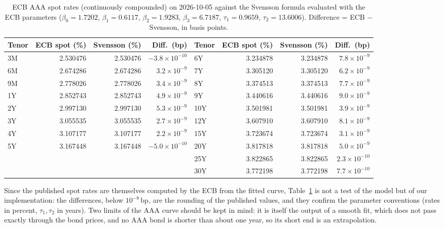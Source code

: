 \documentclass[11pt,a4paper]{article}
\theoremstyle{plain}
\theoremstyle{definition}
\newcommand{\bp}{\,\mathrm{bp}}
\begin{document}
\begin{table}[htbp]
\centering
\footnotesize
\setlength{\tabcolsep}{4pt}
\begin{tabular}{@{}lrrr@{\hspace{1.5em}}lrrr@{}}
\toprule
Tenor & ECB spot (\%) & Svensson (\%) & Diff.\ (bp) & Tenor & ECB spot (\%) & Svensson (\%) & Diff.\ (bp) \\
\midrule
3M  & 2.530476 & 2.530476 & $-3.8\times10^{-10}$ & 6Y  & 3.234878 & 3.234878 & $7.8\times10^{-9}$ \\
6M  & 2.674286 & 2.674286 & $3.2\times10^{-9}$   & 7Y  & 3.305120 & 3.305120 & $6.2\times10^{-9}$ \\
9M  & 2.778026 & 2.778026 & $3.4\times10^{-9}$   & 8Y  & 3.374513 & 3.374513 & $7.7\times10^{-9}$ \\
1Y  & 2.852743 & 2.852743 & $4.9\times10^{-9}$   & 9Y  & 3.440616 & 3.440616 & $9.0\times10^{-9}$ \\
2Y  & 2.997130 & 2.997130 & $5.3\times10^{-9}$   & 10Y & 3.501981 & 3.501981 & $3.9\times10^{-9}$ \\
3Y  & 3.055535 & 3.055535 & $2.7\times10^{-9}$   & 12Y & 3.607910 & 3.607910 & $8.1\times10^{-9}$ \\
4Y  & 3.107177 & 3.107177 & $2.2\times10^{-9}$   & 15Y & 3.723674 & 3.723674 & $3.1\times10^{-9}$ \\
5Y  & 3.167448 & 3.167448 & $-5.0\times10^{-10}$ & 20Y & 3.817818 & 3.817818 & $5.0\times10^{-9}$ \\
    &          &          &                      & 25Y & 3.822865 & 3.822865 & $2.3\times10^{-10}$ \\
    &          &          &                      & 30Y & 3.772198 & 3.772198 & $7.7\times10^{-10}$ \\
\bottomrule
\end{tabular}
\caption{ECB AAA spot rates (continuously compounded) on 2026-10-05 against the Svensson formula evaluated with the ECB parameters
($\beta_0=1.7202$, $\beta_1=0.6117$, $\beta_2=1.9283$, $\beta_3=6.7187$, $\tau_1=0.9659$, $\tau_2=13.6006$). Difference = ECB $-$ Svensson, in basis points.}
\label{tab:svensson-check}
\end{table}

Since the published spot rates are themselves computed by the ECB from the fitted curve, Table~\ref{tab:svensson-check} is not a test of the model but of our implementation: the differences, below $10^{-8}\bp$, are the rounding of the published values, and they confirm the parameter conventions (rates in percent, $\tau_1,\tau_2$ in years). Two limits of the AAA curve should be kept in mind: it is itself the output of a smooth fit, which does not pass exactly through the bond prices, and no AAA bond is shorter than about one year, so its short end is an extrapolation.
\end{document}
